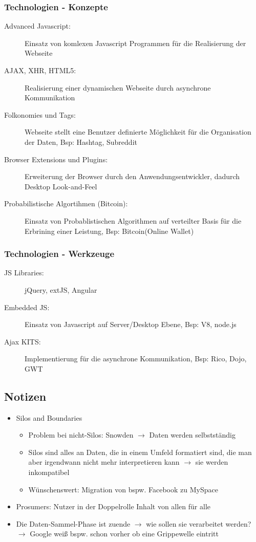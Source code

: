 \documentclass{article} %
\begin{document}
	\subsubsection{Technologien - Konzepte}
	\begin{description}
		\item[Advanced Javascript:] Einsatz von komlexen Javascript Programmen für die Realisierung der Webseite
		\item[AJAX, XHR, HTML5:]  Realisierung einer dynamischen Webseite durch asynchrone Kommunikation
		\item[Folkonomies und Tags:] Webseite stellt eine Benutzer definierte Möglichkeit für die Organisation der Daten, Bsp: Hashtag, Subreddit
		\item[Browser Extensions und Plugins:] Erweiterung der Browser durch den Anwendungsentwickler, dadurch Desktop Look-and-Feel
		\item[Probabilistische Algortihmen (Bitcoin):] Einsatz von Probablistischen Algorithmen auf verteilter Basis für die Erbrining einer Leistung, Bsp: Bitcoin(Online Wallet)
	\end{description}	
	\subsubsection{Technologien - Werkzeuge}
	\begin{description}
		\item[JS Libraries:] jQuery, extJS, Angular
		\item[Embedded JS:] Einsatz von Javascript auf Server/Desktop Ebene, Bsp: V8, node.js
		\item[Ajax KITS:] Implementierung für die asynchrone Kommunikation, Bsp: Rico, Dojo, GWT
	\end{description}
	\subsection{Notizen}
		\begin{itemize}
			\item Silos and Boundaries
				\begin{itemize}
					\item Problem bei nicht-Silos: Snowden $\rightarrow$ Daten werden selbstständig
					\item Silos sind alles an Daten, die in einem Umfeld formatiert sind, die man aber irgendwann nicht mehr interpretieren kann $\rightarrow$ sie werden inkompatibel
					\item Wünschenswert: Migration von bspw. Facebook zu MySpace
				\end{itemize}
				\item Prosumers: Nutzer in der Doppelrolle \glqq Inhalt von allen für alle\grqq
				\item Die Daten-Sammel-Phase ist zuende $\rightarrow$ wie sollen sie verarbeitet werden? $\rightarrow$ Google weiß bspw. schon vorher ob eine Grippewelle eintritt
		\end{itemize}
		
\end{document}
